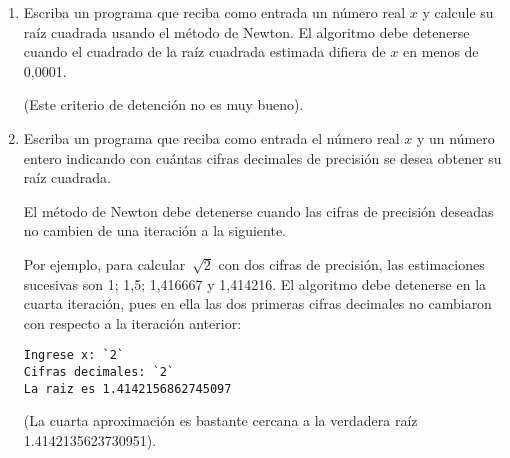 \begin{enumerate}
\item
  Escriba un programa que reciba como entrada un número real \(x\) y
  calcule su raíz cuadrada usando el método de Newton. El algoritmo debe
  detenerse cuando el cuadrado de la raíz cuadrada estimada difiera de
  \(x\) en menos de 0,0001.

  (Este criterio de detención no es muy bueno).
\item
  Escriba un programa que reciba como entrada el número real \(x\) y un
  número entero indicando con cuántas cifras decimales de precisión se
  desea obtener su raíz cuadrada.

  El método de Newton debe detenerse cuando las cifras de precisión
  deseadas no cambien de una iteración a la siguiente.

  Por ejemplo, para calcular~\(\sqrt{2}\) con dos cifras de precisión,
  las estimaciones sucesivas son 1; 1,5; 1,416667 y 1,414216.
  El algoritmo debe detenerse en la cuarta iteración, pues en
  ella las dos primeras cifras decimales no cambiaron con respecto a la
  iteración anterior:

\begin{lstlisting}[language=testcase]
Ingrese x: `2`
Cifras decimales: `2`
La raiz es 1.4142156862745097
\end{lstlisting}

  (La cuarta aproximación es bastante cercana a la verdadera raíz
  1.4142135623730951).
\end{enumerate}
